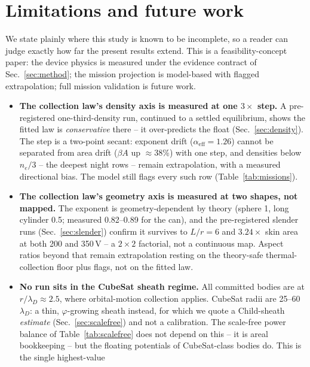 \documentclass[11pt]{article}
\begin{document}
\section{Limitations and future work}
\label{sec:limitations}
We state plainly where this study is known to be incomplete, so a reader can
judge exactly how far the present results extend. This is a
feasibility-concept paper: the device physics is measured under the evidence
contract of Sec.~\ref{sec:method}; the mission projection is model-based
with flagged extrapolation; full mission validation is future work.

\begin{itemize}
  \item \textbf{The collection law's density axis is measured at one
        $3\times$ step.} A pre-registered one-third-density run, continued
        to a settled equilibrium, shows the fitted law is
        \emph{conservative} there -- it over-predicts the float
        (Sec.~\ref{sec:density}). The step is a two-point secant: exponent
        drift ($\alpha_{\mathrm{eff}} = 1.26$) cannot be separated from
        area drift ($\beta A$ up $\approx$38\%) with one step, and
        densities below $n_e/3$ -- the deepest night rows -- remain
        extrapolation, with a measured directional bias. The model still
        flags every such row (Table~\ref{tab:missions}).
  \item \textbf{The collection law's geometry axis is measured at two
        shapes, not mapped.} The exponent is geometry-dependent by theory
        (sphere 1, long cylinder 0.5; measured 0.82--0.89 for the can), and
        the pre-registered slender runs (Sec.~\ref{sec:slender}) confirm it
        survives to $L/r = 6$ and $3.24\times$ skin area at both 200 and
        350\,V -- a $2{\times}2$ factorial, not a continuous map. Aspect
        ratios beyond that remain extrapolation resting on the theory-safe
        thermal-collection floor plus flags, not on the fitted law.
  \item \textbf{No run sits in the CubeSat sheath regime.} All committed
        bodies are at $r/\lambda_D \approx 2.5$, where orbital-motion
        collection applies. CubeSat radii are 25--60\,$\lambda_D$: a thin,
        $\varphi$-growing sheath instead, for which we quote a Child-sheath
        \emph{estimate} (Sec.~\ref{sec:scalefree}) and not a calibration.
        The scale-free power balance of Table~\ref{tab:scalefree} does not
        depend on this -- it is areal bookkeeping -- but the floating
        potentials of CubeSat-class bodies do. This is the single highest-value

\end{itemize}
\end{document}
